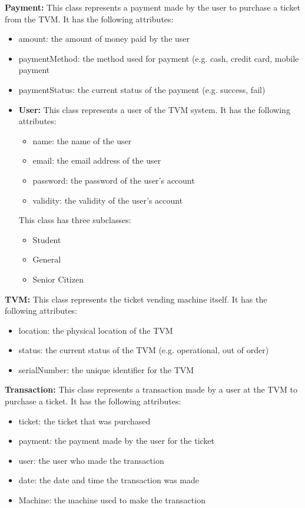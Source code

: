 \documentclass[a4paper, 11pt]{report}
\begin{document}
  \item \textbf{Payment: } This class represents a payment made by the user to purchase a ticket from the TVM. It has the following attributes:
    \begin{itemize}
    \item amount: the amount of money paid by the user
    \item paymentMethod: the method used for payment (e.g. cash, credit card, mobile payment
    \item paymentStatus: the current status of the payment (e.g. success, fail) 
  
    
    \item \textbf{User: }  This class represents a user of the TVM system. It has the following attributes:
       \begin{itemize}
       \item  name: the name of the user
        \item email: the email address of the user
        \item password: the password of the user's account
        \item validity: the validity of the user's account
        \end{itemize}
        This class has three subclasses:
        \begin{itemize}
        \item Student
        \item General
        \item Senior Citizen
         \end{itemize}
          
     \end{itemize}

  \item \textbf{TVM: } This class represents the ticket vending machine itself. It has the following attributes:
\begin{itemize}
\item location: the physical location of the TVM
\item status: the current status of the TVM (e.g. operational, out of order)
\item serialNumber: the unique identifier for the TVM
 \end{itemize}

\item \textbf{ Transaction: } This class represents a transaction made by a user at the TVM to purchase a ticket. It has the following attributes:
\begin{itemize}
\item ticket: the ticket that was purchased
\item payment: the payment made by the user for the ticket
\item user: the user who made the transaction
\item date: the date and time the transaction was made
\item  Machine: the machine used to make the transaction
 \end{itemize}
\end{document}
